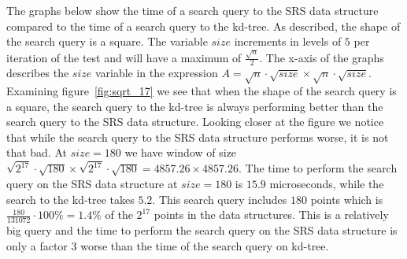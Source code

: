 The graphs below show the time of a search query to the SRS data structure compared to the time of a search query to the kd-tree. As described, the shape of the search query is a square. The variable $size$ increments in levels of $5$ per iteration of the test and will have a maximum of $\frac{\sqrt{n}}{2}$. The x-axis of the graphs describes the $size$ variable in the expression $A = \sqrt{n}\cdot\sqrt{size} \times \sqrt{n}\cdot\sqrt{size}$. Examining figure~\ref{fig:sqrt_17} we see that when the shape of the search query is a square, the search query to the kd-tree is always performing better than the search query to the SRS data structure. Looking closer at the figure we notice that while the search query to the SRS data structure performs worse, it is not that bad. At $size = 180$ we have window of size $\sqrt{2^{17}}\cdot\sqrt{180} \times \sqrt{2^{17}}\cdot\sqrt{180} = 4857.26 \times 4857.26$. The time to perform the search query on the SRS data structure at $size = 180$ is $15.9$ microseconds, while the search to the kd-tree takes $5.2$. This search query includes $180$ points which is $\frac{180}{131072}\cdot 100\% = 1.4\%$ of the $2^{17}$ points in the data structures. This is a relatively big query and the time to perform the search query on the SRS data structure is only a factor $3$ worse than the time of the search query on kd-tree.

